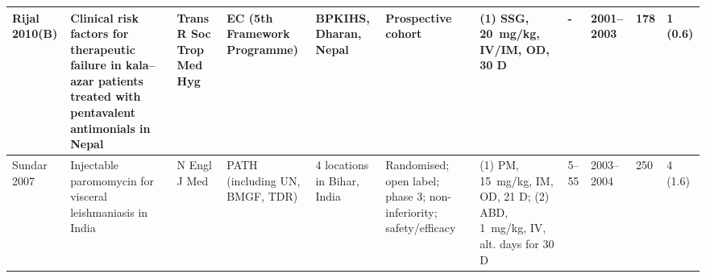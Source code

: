 \begin{ThreePartTable}
\begin{longtable}[c]{L{1.5cm} L{3.5cm} L{1.3cm} L{2.5cm} L{2.5cm} L{2.5cm} L{3cm} L{1.5cm} L{1cm} L{1cm} L{1.3cm}}
    Rijal 2010(B)\cite{rijal2010b}                  & Clinical risk factors for therapeutic failure in kala--azar patients treated with pentavalent antimonials in Nepal                                                                                                          & Trans R Soc Trop Med Hyg & EC (5th Framework Programme)                                                         & BPKIHS, Dharan, Nepal                             & Prospective cohort                                                                 & (1) SSG, 20~mg/kg, IV/IM, OD, 30 D                                                                                                                                                                           & -           & 2001--2003   & 178          & 1 (0.6)                                                                                                                                                                                                                                                                                                                                                                                                                                                                                                                                                                                        \\ \midrule
    Sundar 2007\cite{sundar2007a,sundar2005prot}    & Injectable paromomycin for visceral leishmaniasis in India                                                                                                                                                                  & N Engl J Med             & PATH (including UN, BMGF, TDR)                                                       & 4 locations in Bihar, India                       & Randomised; open label; phase 3; non-inferiority; safety/efficacy                  & (1) PM, 15~mg/kg, IM, OD, 21 D; (2) ABD, 1~mg/kg, IV, alt. days for 30 D                                                                                                                                              & 5--55       & 2003--2004   & 250 & 4 (1.6)                                                                                                                                                                                                                                                                                                                                                                                                                                                                                                                                                                                        \\ \midrule

\end{longtable}
\end{ThreePartTable}
